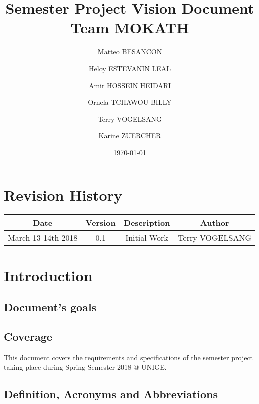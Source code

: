 \documentclass[12pt,a4paper,oneside, titlepage]{article}
\title {Semester Project Vision Document  \\ \large Team MOKATH}
\author{Matteo BESANCON}
\author{Heloy ESTEVANIN LEAL}
\author{Amir HOSSEIN HEIDARI}
\author{Ornela TCHAWOU BILLY}
\author{Terry VOGELSANG}
\author{Karine ZUERCHER}
\affil{Centre Universitaire D'Informatique, University Of Geneva}
\date{\today}
\begin{document}
	\renewcommand{\labelitemi}{$\bullet$}
	\maketitle
	\tableofcontents
	\newpage
	

		\section{Revision History}
		
		\begin{center}
		\def\arraystretch{1.5}
            \begin{tabular}{| c | c | c | c |}
            \hline
            Date & Version & Description & Author \\ \hline
            March 13-14th 2018 & 0.1 & Initial Work  & Terry VOGELSANG \\ \hline
            \end{tabular}
        \end{center}
        
        \newpage
        

	\section{Introduction}
	
		\subsection{Document's goals}
		\subsection{Coverage}
		    This document covers the requirements and specifications of the semester project
		    taking place during Spring Semester 2018 @ UNIGE.
		    
		\subsection{Definition, Acronyms and Abbreviations}
		
\end{document}
